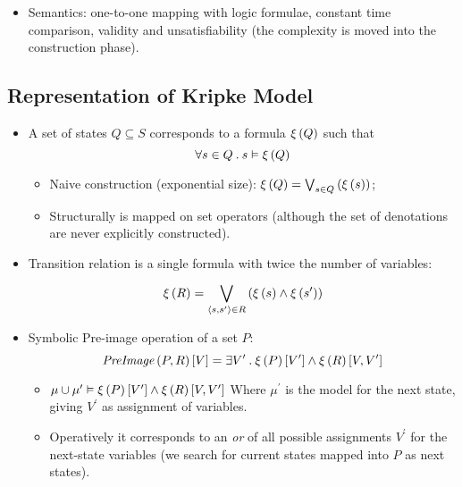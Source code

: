 \begin{itemize}
    \item   Semantics: one-to-one mapping with logic formulae, constant
            time comparison, validity and unsatisfiability (the complexity
            is moved into the construction phase).

    \end{itemize}

\subsection{Representation of Kripke Model}

    \begin{itemize}

    \item   A set of states $Q \subseteq S$ corresponds to a formula
            $\xi\left({Q}\right)$ such that
            \[ \forall s \in Q \:.\: s \vDash \xi\left({Q}\right) \]

        \begin{itemize}
        \item   Naive construction (exponential size):
                $\xi\left({Q}\right) = \bigvee_{s \in Q}^{}\left({\xi\left({s}\right)}\right)$;
        \item   Structurally is mapped on set operators (although the set
                of denotations are never explicitly constructed).
        \end{itemize}

    \item   Transition relation is a single formula with
            twice the number of variables:
        \[
        \xi\left({R}\right) = \bigvee_{\left<{s, s^\prime}\right> \in R}^{}\left({\xi\left({s}\right) \wedge \xi\left({s^\prime}\right)}\right)
        \]

    \item   Symbolic Pre-image operation of a set $P$:
        \[
        \mbox{\emph{PreImage}}\left({P, R}\right)[V] = \exists V^\prime \:.\: \xi\left({P}\right)[V^\prime]
                             \wedge \xi\left({R}\right)[V, V^\prime]
        \]
        \begin{itemize}

        \item   $\mu \cup \mu^\prime \vDash \xi\left({P}\right)[V^\prime]
                            \wedge \xi\left({R}\right)[V, V^\prime]$
                Where $\mu^\prime$ is the model for the next state, giving
                $V^\prime$ as assignment of variables.

        \item   Operatively it corresponds to an \emph{or} of all possible
                assignments $V^\prime$ for the next-state variables (we
                search for current states mapped into $P$ as next states).


\end{itemize}
\end{itemize}
